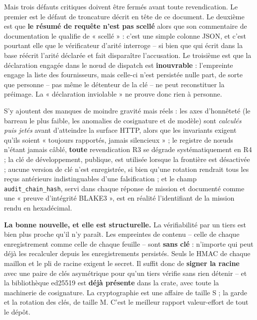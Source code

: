 \documentclass[10pt]{article}
\newcommand{\code}[1]{\texttt{\small #1}}
\begin{document}
Mais trois défauts critiques doivent être fermés avant toute revendication. Le premier est le défaut de
troncature décrit en tête de ce document. Le deuxième est que \textbf{le résumé de requête n'est pas
scellé} alors que son commentaire de documentation le qualifie de « scellé » : c'est une simple colonne
JSON, et c'est pourtant elle que le vérificateur d'arité interroge -- si bien que qui écrit dans la base
réécrit l'arité déclarée et fait disparaître l'accusation. Le troisième est que la déclaration engagée
dans le n\oe{}ud de dispatch est \textbf{inouvrable} : l'empreinte engage la liste des fournisseurs,
mais celle-ci n'est persistée nulle part, de sorte que personne -- pas même le détenteur de la clé -- ne
peut reconstituer la préimage. La « déclaration inviolable » ne prouve donc rien à personne.

S'y ajoutent des manques de moindre gravité mais réels : les axes d'honnêteté (le barreau le plus
faible, les anomalies de cosignature et de modèle) sont \emph{calculés puis jetés} avant d'atteindre la
surface HTTP, alors que les invariants exigent qu'ils soient « toujours rapportés, jamais silencieux » ;
le registre de n\oe{}uds n'étant jamais câblé, \textbf{toute} revendication R3 se dégrade
systématiquement en R4 ; la clé de développement, publique, est utilisée lorsque la frontière est
désactivée ; aucune version de clé n'est enregistrée, si bien qu'une rotation rendrait tous les reçus
antérieurs indistinguables d'une falsification ; et le champ \code{audit\_chain\_hash}, servi dans
chaque réponse de mission et documenté comme une « preuve d'intégrité BLAKE3 », est en réalité
l'identifiant de la mission rendu en hexadécimal.

\begin{these}
\textbf{La bonne nouvelle, et elle est structurelle.} La vérifiabilité par un tiers est bien plus proche
qu'il n'y paraît. Les empreintes de contenu -- celle de chaque enregistrement comme celle de chaque
feuille -- sont \textbf{sans clé} : n'importe qui peut déjà les recalculer depuis les enregistrements
persistés. Seuls le HMAC de chaque maillon et le pli de racine exigent le secret. Il suffit donc de
\textbf{signer la racine} avec une paire de clés asymétrique pour qu'un tiers vérifie sans rien
détenir -- et la bibliothèque ed25519 est \textbf{déjà présente} dans la crate, avec toute la machinerie
de cosignature. La cryptographie est une affaire de taille S ; la garde et la rotation des clés, de
taille M. C'est le meilleur rapport valeur-effort de tout le dépôt.
\end{these}
\end{document}
